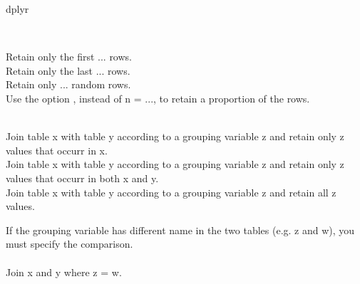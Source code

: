 \begin{block}{dplyr}
\begin{columns}[t]
\begin{column}{.48\linewidth}
       \\ Retain only the first ... rows. \br
       \\ Retain only the last ... rows. \br
       \\ Retain only ... random rows.\\
      Use the option , instead of n = ..., to retain a proportion of the rows.
    
       \\ Join table x with table y according to a grouping variable z and retain only z values that occurr in x. \br
       \\ Join table x with table y according to a grouping variable z and retain only z values that occurr in both x and y. \br
       \\ Join table x with table y according to a grouping variable z and retain all z values. \br

      If the grouping variable has different name in the two tables (e.g. z and w), you must specify the comparison.\\
      \\
      Join x and y where z = w.

    \end{column}\hfill\hfill\hfill
    \end{columns}
    
\end{block}
